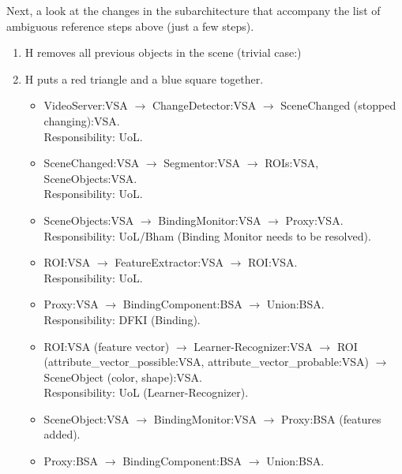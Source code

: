 \documentclass{article}
\begin{document}
\noindent
Next, a look at the changes in the subarchitecture that accompany the
list of ambiguous reference steps above (just a few steps).
\begin{enumerate}
\item \label{lvl2a:step1} H removes all previous objects in the scene (trivial case:)

\item \label{lvl2a:step2} H puts a red triangle and a blue square
  together.

\begin{itemize}
\item \label{lvl2a:step2:detail1} VideoServer:VSA $\to$
  ChangeDetector:VSA $\to$ SceneChanged (stopped changing):VSA. \\
  Responsibility: UoL.

\item \label{lvl2a:step2:detail2} SceneChanged:VSA $\to$
  Segmentor:VSA $\to$ ROIs:VSA, SceneObjects:VSA. \\
  Responsibility: UoL.

\item \label{lvl2a:step2:detail3} SceneObjects:VSA $\to$
  BindingMonitor:VSA $\to$ Proxy:VSA. \\
  Responsibility: UoL/Bham (Binding Monitor needs to be resolved).

\item \label{lvl2a:step2:detail4} ROI:VSA $\to$
  FeatureExtractor:VSA $\to$ ROI:VSA. \\
  Responsibility: UoL.

\item \label{lvl2a:step2:detail5} Proxy:VSA $\to$ BindingComponent:BSA
  $\to$ Union:BSA. \\
  Responsibility: DFKI (Binding).

\item \label{lvl2a:step2:detail6} ROI:VSA (feature vector) $\to$
  Learner-Recognizer:VSA $\to$ ROI (attribute\_vector\_possible:VSA,
  attribute\_vector\_probable:VSA) $\to$ SceneObject (color,
  shape):VSA.\\
  Responsibility: UoL (Learner-Recognizer).

\item \label{lvl2a:step2:detail7} SceneObject:VSA $\to$
  BindingMonitor:VSA $\to$ Proxy:BSA (features added).

\item \label{lvl2a:step2:detail8} Proxy:BSA $\to$
  BindingComponent:BSA $\to$ Union:BSA.

\end{itemize}

\end{enumerate}
\end{document}
